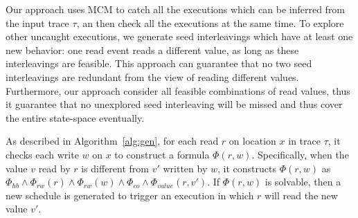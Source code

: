 \documentclass[preprint, numbers, 10pt]{sigplanconf}
\begin{document}
Our approach uses MCM to catch all the executions which can be inferred 
from the input trace $\tau$, an then check all the executions at the same time. 
To explore other uncaught executions, we generate seed interleavings
which have at least one new behavior: one read event reads a different
value, as long as these interleavings are feasible. This approach can guarantee
that no two seed interleavings are redundant from the view of reading 
different values. Furthermore, our approach consider all feasible combinations
of read values, thus it guarantee that no unexplored seed interleaving will
be missed and thus cover the entire state-space eventually. 


As described in Algorithm~\ref{alg:gen}, for each read $r$ on location $x$
in trace $\tau$, it checks each write $w$ on $x$ to construct a formula $\Phi(r,w)$.
Specifically, when the value $v$ read by $r$ is different from $v'$ written by $w$,
it constructs $\Phi(r,w)$ as 
$\Phi_{hb}\wedge\Phi_{rw}(r)\wedge\Phi_{rw}(w)\wedge \Phi_{co}\wedge\Phi_{value}(r,v')$.
If $\Phi(r,w)$ is solvable, then a new schedule is generated to trigger an execution in which
$r$ will read the new value $v'$. 








\end{document}
